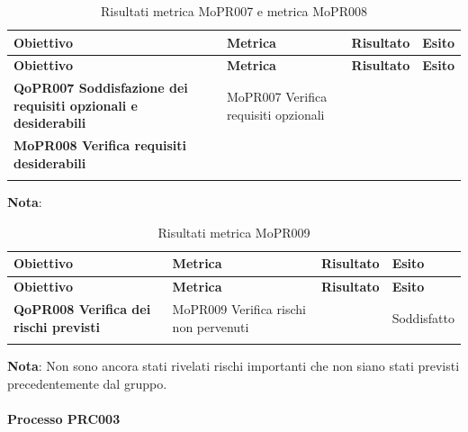 \documentclass[../piano-di-qualifica.tex]{subfiles}
\begin{document}
\renewcommand{\arraystretch}{2} %
\begin{longtable}[H]{>{\centering\bfseries}m{5cm} >{\centering}m{5cm} >{\centering}m{2.5cm} >{\centering\arraybackslash}m{2.5cm}}  
  \rowcolor{lightgray}
  {\textbf{Obiettivo}} & {\textbf{Metrica}} & {\textbf{Risultato}} & {\textbf{Esito}}  \\
  \endfirsthead%
  \rowcolor{lightgray}
  {\textbf{Obiettivo}} & {\textbf{Metrica}} & {\textbf{Risultato}} & {\textbf{Esito}}  \\
  \endhead%
  \textbf{QoPR007 Soddisfazione dei requisiti opzionali e desiderabili} & MoPR007 Verifica requisiti opzionali \\ MoPR008 Verifica requisiti desiderabili &  &  \\
  \caption{Risultati metrica MoPR007 e metrica MoPR008}
  \label{tab:my-table}
\end{longtable}
\textbf{Nota}: 

\renewcommand{\arraystretch}{2} %
\begin{longtable}[H]{>{\centering\bfseries}m{5cm} >{\centering}m{5cm} >{\centering}m{2.5cm} >{\centering\arraybackslash}m{2.5cm}}  
  \rowcolor{lightgray}
  {\textbf{Obiettivo}} & {\textbf{Metrica}} & {\textbf{Risultato}} & {\textbf{Esito}}  \\
  \endfirsthead%
  \rowcolor{lightgray}
  {\textbf{Obiettivo}} & {\textbf{Metrica}} & {\textbf{Risultato}} & {\textbf{Esito}}  \\
  \endhead%
  \textbf{QoPR008 Verifica dei rischi previsti} & MoPR009 Verifica rischi non pervenuti & 0 & Soddisfatto \\
  \caption{Risultati metrica MoPR009}
  \label{tab:my-table}
\end{longtable}
\textbf{Nota}: Non sono ancora stati rivelati rischi importanti che non siano stati previsti precedentemente dal gruppo.

\paragraph{Processo PRC003}
\label{sub:processo_PRC003}
\end{document}
